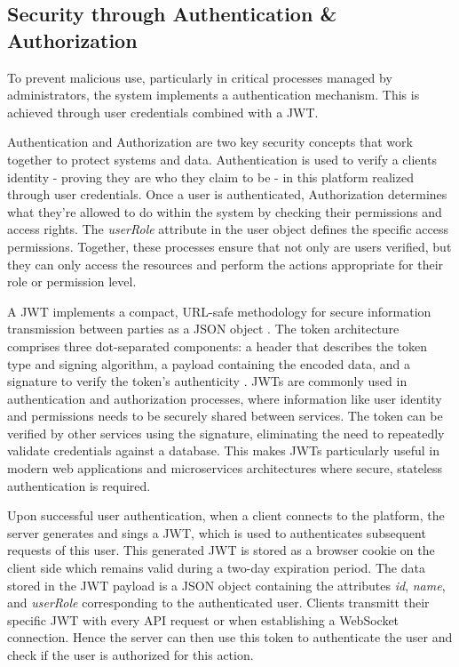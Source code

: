\subsection{Security through Authentication \& Authorization}
\label{subsec:implementation:authentication}
To prevent malicious use, particularly in critical processes managed by administrators, the system implements a authentication mechanism. This is achieved through user credentials combined with a \ac{JWT}.

Authentication and Authorization are two key security concepts that work together to protect systems and data. Authentication is used to verify a clients identity - proving they are who they claim to be - in this platform realized through user credentials. Once a user is authenticated, Authorization determines what they're allowed to do within the system by checking their permissions and access rights. The \emph{userRole} attribute in the user object defines the specific access permissions. Together, these processes ensure that not only are users verified, but they can only access the resources and perform the actions appropriate for their role or permission level.

A \ac{JWT} implements a compact, URL-safe methodology for secure information transmission between parties as a \acs{JSON} object \cite{implementation:jwt}. The token architecture comprises three dot-separated components: a header that describes the token type and signing algorithm, a payload containing the encoded data, and a signature to verify the token's authenticity \cite{implementation:jwt}. \ac{JWT}s are commonly used in authentication and authorization processes, where information like user identity and permissions needs to be securely shared between services. The token can be verified by other services using the signature, eliminating the need to repeatedly validate credentials against a database. This makes \ac{JWT}s particularly useful in modern web applications and microservices architectures where secure, stateless authentication is required. \cite{implementation:jwt}

Upon successful user authentication, when a client connects to the platform, the server generates and sings a \ac{JWT}, which is used to authenticates subsequent requests of this user. This generated \ac{JWT} is stored as a browser cookie on the client side which remains valid during a two-day expiration period. The data stored in the \ac{JWT} payload is a \acs{JSON} object containing the attributes \emph{id}, \emph{name}, and \emph{userRole} corresponding to the authenticated user. Clients transmitt their specific \ac{JWT} with every \ac{API} request or when establishing a WebSocket connection. Hence the server can then use this token to authenticate the user and check if the user is authorized for this action.

